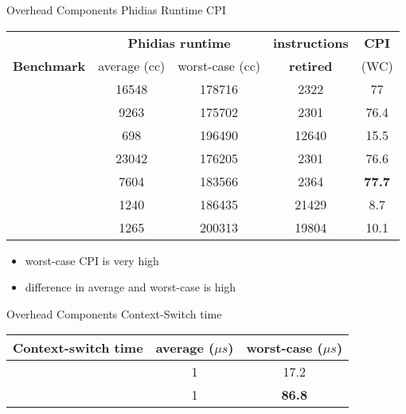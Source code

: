 \documentclass[10pt,hyperref={hyperfootnotes=false}, xcolor={usenames, dvipsnames}]{beamer}
\begin{document}
\begin{frame}[allowframebreaks]{Overhead Components} {Phidias Runtime CPI}
	\begin{table}[H]
	\centering
	\begin{tabular}{|c|c|c|c|c|}  
	\hline
							& \multicolumn{2}{|c|}{\textbf{Phidias runtime}} & \textbf{instructions}	& \textbf{CPI} \\
	\textbf{Benchmark}		& average (cc)	&	worst-case (cc)	&	\textbf{retired} &	(WC) \\ \hline 
	\mcachepressure{}	& 16548	& 178716 & 2322 & 77 \\ \hline
	\mforkops{}		& 9263 & 175702 & 2301 & 76.4 \\ \hline
	\mfileops{}		& 698 & 196490 & 12640 & 15.5 \\ \hline
	\mhackbench{} 		& 23042 & 176205 & 2301 & 76.6 \\ \hline
	\mmmapops{} 		& 7604 & 183566 & 2364 & \textbf{77.7} \\ \hline
	\mstdout{} 			& 1240 & 186435 & 21429 & 8.7 \\ \hline
	\mthreadops{} 		& 1265 & 200313 & 19804 & 10.1 \\ \hline
	\end{tabular}
	\end{table}

	\begin{itemize}
		\item {worst-case CPI is very high}
		\item {difference in average and worst-case is high}
	\end{itemize}
\end{frame}

\begin{frame}[allowframebreaks]{Overhead Components} {Context-Switch time}
	\begingroup
	
	\endgroup	    
	\begin{table}[H]
	\centering
	\begin{tabular}{|c||c|c|}  
	\hline
		Context-switch time	&	average ($\mu{}s$)	&	worst-case ($\mu{}s$) \\ \hline \hline
		\mnoload{}				&	1			& 		17.2 \\ \hline
		\mcachepressure{}		&	1			& \textbf{86.8}\\ \hline
	\end{tabular}
	\end{table}
\end{frame}
\end{document}
